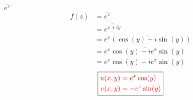 \item[15.] $\overline{e^z}$
\begin{align*}
    f(z) 
    &= \overline{e^z} \\
    &= \overline{e^{x+iy}}\\
    &= \overline{e^x(\cos(y)+i\sin(y))}\\
    &= \overline{e^x\cos(y)+ie^x\sin(y)}\\
    &= e^x\cos(y)-ie^x\sin(y)
\end{align*}
\[
\boxed{
\textcolor{red}{
\begin{aligned}
u(x,y) &= e^x\cos(y) \\
v(x,y) &= -e^x\sin(y)
\end{aligned}
}
}
\]
